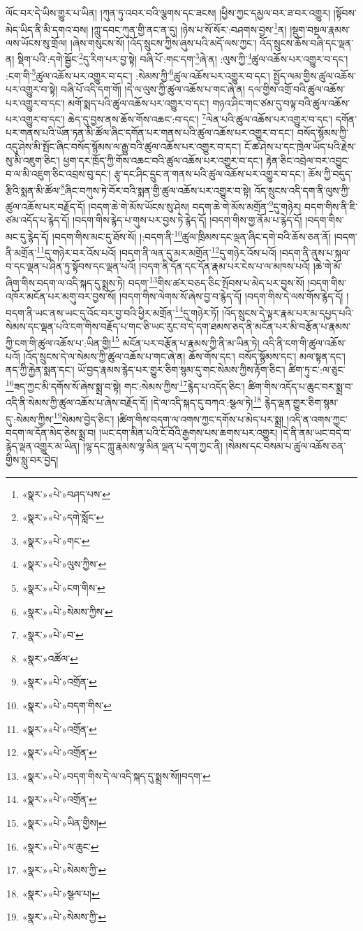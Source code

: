 ལོང་བར་དེ་ཡིས་གྱུར་པ་ཡིན། །ཀུན་ཏུ་འབར་བའི་ལྕགས་དང་ཟངས། །ཕྱིས་ཀྱང་དམྱལ་བར་ཟ་བར་འགྱུར། །སྟོབས་མེད་ཡིད་ནི་མི་དགའ་བས། །ཀླུ་དབང་ཀུན་གྱི་ནང་ན་དུ། །ཉེས་པ་སོ་སོར་:བཤགས་བྱས་\footnote{«སྣར་»«པེ་»བཤད་པས་}ན། །སྡུག་བསྔལ་རྣམས་ལས་ཡོངས་སུ་གྲོལ། །ཞེས་གསུངས་སོ། །འོད་སྲུངས་ཀྱིས་ཞུས་པའི་མདོ་ལས་ཀྱང་། འོད་སྲུངས་ཆོས་བཞི་དང་ལྡན་ན། སྡིག་པའི་:དགེ་སྦྱོང་\footnote{«སྣར་»«པེ་»དགེ་སློང་}དུ་རིག་པར་བྱ་སྟེ། བཞི་པོ་:གང་དག་\footnote{«སྣར་»«པེ་»གང་}ཞེ་ན། :ལུས་ཀྱི་\footnote{«སྣར་»«པེ་»ལུས་ཀྱིས་}ཚུལ་འཆོས་པར་འགྱུར་བ་དང་། :ངག་གི་\footnote{«སྣར་»«པེ་»ངག་གིས་}ཚུལ་འཆོས་པར་འགྱུར་བ་དང་། :སེམས་ཀྱི་\footnote{«སྣར་»«པེ་»སེམས་ཀྱིས་}ཚུལ་འཆོས་པར་འགྱུར་བ་དང་། སྤྱོད་ལམ་གྱིས་ཚུལ་འཆོས་པར་འགྱུར་བ་སྟེ། བཞི་པོ་འདི་དག་གོ། །དེ་ལ་ལུས་ཀྱི་ཚུལ་འཆོས་པ་གང་ཞེ་ན། དལ་གྱིས་འགྲོ་བའི་ཚུལ་འཆོས་པར་འགྱུར་བ་དང་། མགོ་སྨད་པའི་ཚུལ་འཆོས་པར་འགྱུར་བ་དང་། གཉའ་ཤིང་གང་ཙམ་དུ་བལྟ་བའི་ཚུལ་འཆོས་པར་འགྱུར་བ་དང་། ཆེད་དུ་བྱས་ནས་ཆོས་གོས་འཆང་:བ་དང་། \footnote{«སྣར་»«པེ་»བ་}ལེན་པའི་ཚུལ་འཆོས་པར་འགྱུར་བ་དང་། དགོན་པར་གནས་པའི་ཡོན་ཏན་མི་ཚོལ་ཞིང་དགོན་པར་གནས་པའི་ཚུལ་འཆོས་པར་འགྱུར་བ་དང་། བསོད་སྙོམས་ཀྱི་འདུ་ཤེས་མི་སྤོང་ཞིང་བསོད་སྙོམས་ལ་རྒྱུ་བའི་ཚུལ་འཆོས་པར་འགྱུར་བ་དང་། ངོ་ཚ་ཤེས་པ་དང་ཁྲེལ་ཡོད་པའི་རྗེས་སུ་མི་འཇུག་ཅིང་། ཕྱག་དར་ཁྲོད་ཀྱི་གོས་འཆང་བའི་ཚུལ་འཆོས་པར་འགྱུར་བ་དང་། རྟེན་ཅིང་འབྲེལ་བར་འབྱུང་བ་ལ་མི་འཇུག་ཅིང་འབྲས་བུ་དང་། རྩྭ་དང་ཤིང་དྲུང་ན་གནས་པའི་ཚུལ་འཆོས་པར་འགྱུར་བ་དང་། ཆོས་ཀྱི་བདུད་རྩིའི་སྨན་མི་ཚོལ་\footnote{«སྣར་»འཚོལ་}ཞིང་བཀུས་ཏེ་བོར་བའི་སྨན་གྱི་ཚུལ་འཆོས་པར་འགྱུར་བ་སྟེ། འོད་སྲུངས་འདི་དག་ནི་ལུས་ཀྱི་ཚུལ་འཆོས་པར་བརྗོད་དོ། །བདག་ཆེ་གེ་མོས་ཡོངས་སུ་ཤེས། བདག་ཆེ་གེ་མོས་མགྲོན་\footnote{«སྣར་»«པེ་»འགྲོན་}དུ་གཉེར། བདག་གིས་ནི་ཇི་ཙམ་འདོད་པ་རྙེད་དོ། །བདག་གིས་རྙེད་པ་གུས་པར་བྱས་ཏེ་རྙེད་དོ། །བདག་གིས་གྱ་ནོམ་པ་རྙེད་དོ། །བདག་གིས་མང་དུ་རྙེད་དོ། །བདག་གིས་མང་དུ་ཐོས་སོ། །:བདག་ནི་\footnote{«སྣར་»«པེ་»བདག་གིས་}ཚུལ་ཁྲིམས་དང་ལྡན་ཞིང་དགེ་བའི་ཆོས་ཅན་ནོ། །བདག་ནི་མགྲོན་\footnote{«སྣར་»«པེ་»འགྲོན་}དུ་གཉེར་བར་འོས་པའོ། །བདག་ནི་ལན་དུ་མར་མགྲོན་\footnote{«སྣར་»«པེ་»འགྲོན་}དུ་གཉེར་འོས་པའོ། །བདག་ནི་ནུས་པ་སྐལ་བ་དང་ལྡན་པ་ཤིན་ཏུ་སྟོབས་དང་ལྡན་པའོ། །བདག་ནི་དོན་དང་དོན་རྣམ་པར་ངེས་པ་ལ་མཁས་པའོ། །ཆེ་གེ་མོ་ཞིག་གིས་བདག་ལ་འདི་སྐད་དུ་སྨྲས་ཏེ། བདག་\footnote{«སྣར་»«པེ་»བདག་གིས་དེ་ལ་འདི་སྐད་དུ་སྨྲས་སོ།།བདག་}གིས་ཚར་བཅད་ཅིང་སྤོབས་པ་མེད་པར་བྱས་སོ། །བདག་གིས་འཁོར་མངོན་པར་མགུ་བར་བྱས་སོ། །བདག་གིས་ལེགས་སོ་ཞེས་བྱ་བ་རྙེད་དོ། །བདག་གིས་དེ་ལས་གོས་རྙེད་དོ། །བདག་ནི་ཡང་ནས་ཡང་དུ་འོང་བར་བྱ་བའི་ཕྱིར་མགྲོན་\footnote{«སྣར་»«པེ་»འགྲོན་}དུ་གཉེར་ཏོ། །འོད་སྲུངས་དེ་ལྟར་རྣམ་པར་མ་དཔྱད་པའི་སེམས་དང་ལྡན་པའི་ངག་གིས་བརྗོད་པ་གང་ཅི་ཡང་རུང་བ་དེ་དག་ཐམས་ཅད་ནི་མངོན་པར་མི་བརྩོན་པ་རྣམས་ཀྱི་ངག་གི་ཚུལ་འཆོས་པ་:ཡིན་གྱི།\footnote{«སྣར་»«པེ་»ཡིན་གྱིས།} མངོན་པར་བརྩོན་པ་རྣམས་ཀྱི་ནི་མ་ཡིན་ཏེ། འདི་ནི་ངག་གི་ཚུལ་འཆོས་པའོ། །འོད་སྲུངས་དེ་ལ་སེམས་ཀྱི་ཚུལ་འཆོས་པ་གང་ཞེ་ན། ཆོས་གོས་དང་། བསོད་སྙོམས་དང་། མལ་སྟན་དང་། ནད་ཀྱི་རྐྱེན་སྨན་དང་། ཡོ་བྱད་རྣམས་རྙེད་པར་གྱུར་ཅིག་སྙམ་དུ་གང་སེམས་ཀྱིས་རྟོག་ཅིང་། ཚིག་ཏུ་ང་:ལ་ཅུང་\footnote{«སྣར་»«པེ་»ལ་ཆུང་}ཟད་ཀྱང་མི་དགོས་སོ་ཞེས་སྨྲ་བ་སྟེ། གང་:སེམས་ཀྱིས་\footnote{«སྣར་»«པེ་»སེམས་ཀྱི་}རྙེད་པ་འདོད་ཅིང་། ཚིག་གིས་འདོད་པ་ཆུང་བར་སྨྲ་བ་འདི་ནི་སེམས་ཀྱི་ཚུལ་འཆོས་པ་ཞེས་བརྗོད་དོ། །དེ་ལ་འདི་སྐད་དུ་བཀའ་:སྩལ་ཏེ།\footnote{«སྣར་»«པེ་»སྩལ་པ།} རྙེད་ལྡན་གྱུར་ཅིག་སྙམ་དུ་:སེམས་ཀྱིས་\footnote{«སྣར་»«པེ་»སེམས་ཀྱི་}སེམས་བྱེད་ཅིང་། །ཚིག་གིས་བདག་ལ་འགས་ཀྱང་དགོས་པ་མེད་པར་སྨྲ། །འདི་ན་འགས་ཀྱང་བདག་ལ་དོན་མེད་ཅེས་སྨྲ་བ། །ཡང་དག་མིན་པའི་ངོ་བོའི་རྒྱགས་པས་ཆགས་པར་འགྱུར། །དེ་ནི་ནམ་ཡང་བདེ་བ་རྙེད་ལྡན་འགྱུར་མ་ཡིན། །ལྷ་དང་ཀླུ་རྣམས་ལྷ་མིན་ལྡན་པ་དག་ཀྱང་ནི། །སེམས་དང་བསམ་པ་ཚུལ་འཆོས་ཅན་གྱིས་སླུ་བར་བྱེད། 